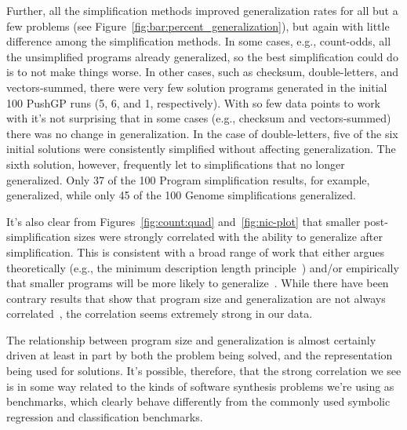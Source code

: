 Further, all the simplification methods improved generalization rates for
all but a few problems (see Figure~\ref{fig:bar:percent_generalization}),
but again with little difference among the simplification methods.
In some cases, e.g., count-odds, all the unsimplified programs already
generalized, so the best simplification could do is to not make things
worse. In other cases, such as
checksum, double-letters, and vectors-summed, there were very few 
solution programs generated in the initial 100 PushGP runs (5, 6, and 1,
respectively). With so few data points to work with it's not surprising
that in some cases (e.g., checksum and vectors-summed) there was no change
in generalization. In the case of double-letters, five of the six initial
solutions were consistently simplified without affecting generalization.
The sixth solution, however, frequently let to simplifications that no 
longer generalized. Only 37 of the 100 Program simplification results, 
for example, generalized, while only 45 of the 100 Genome simplifications
generalized.


It's also clear from Figures~\ref{fig:count:quad} and~\ref{fig:nic-plot} that
smaller post-simplification sizes were strongly correlated with the
ability to generalize after simplification. This is consistent with 
a broad range of work that either argues theoretically (e.g., the minimum
description length principle~\cite{iba1994genetic, zhang1995balancing}) 
and/or empirically
that smaller programs will be more likely to generalize~\cite{thing1, thing2}.
While there have been contrary results that show that program size and
generalization are not always correlated~\cite{silva2012operator}, the
correlation seems extremely strong in our data. 

The relationship between
program size and generalization is almost certainly driven at least in part
by both the problem being solved, and the representation being used for
solutions. It's possible, therefore, that the strong correlation we see
is in some way related to the kinds of software synthesis problems we're using
as benchmarks, which clearly behave differently from the commonly used
symbolic regression and classification benchmarks. 

